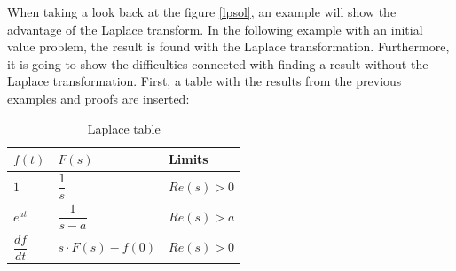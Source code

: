 When taking a look back at the figure \ref{lpsol}, an example will show the advantage of the Laplace transform. In the following example with an initial value problem, the result is found with the Laplace transformation. Furthermore, it is going to show the difficulties connected with finding a result without the Laplace transformation. First, a table with the results from the previous examples and proofs are inserted:

\begin{table}[H]
\center
\begin{tabular}{lll}
\hline
\multicolumn{1}{|l|}{$f(t)$}           & \multicolumn{1}{l|}{$F(s)$}                & \multicolumn{1}{l|}{Limits}    \\ \hline
\multicolumn{1}{|l|}{$1$}              & \multicolumn{1}{l|}{$\dfrac{1}{s}$}        & \multicolumn{1}{l|}{$Re(s)>0$} \\ \hline
\multicolumn{1}{|l|}{$e^{at}$}         & \multicolumn{1}{l|}{$\dfrac{1}{s-a}$}      & \multicolumn{1}{l|}{$Re(s)>a$} \\ \hline
\multicolumn{1}{|l|}{$\dfrac{df}{dt}$} & \multicolumn{1}{l|}{$s \cdot F(s) - f(0)$} & \multicolumn{1}{l|}{$Re(s)>0$} \\ \hline                          
\end{tabular}
\caption{Laplace table}
\label{lptable}
\end{table}

